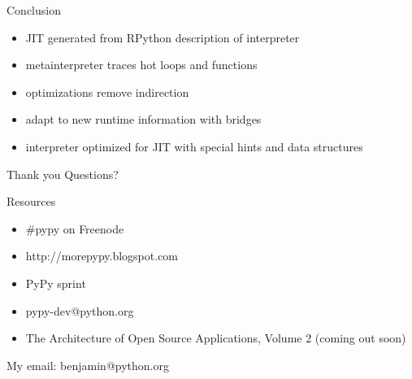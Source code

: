 \documentclass[14pt]{beamer}
\begin{document}
\begin{frame}{Conclusion}
\begin{itemize}
\item JIT generated from RPython description of interpreter
\item metainterpreter traces hot loops and functions
\item optimizations remove indirection
\item adapt to new runtime information with bridges
\item interpreter optimized for JIT with special hints and data structures
\end{itemize}
\end{frame}

\begin{frame}[fragile]{Thank you}
Questions?

Resources
\begin{itemize}
\item \#pypy on Freenode
\item http://morepypy.blogspot.com
\item PyPy sprint
\item pypy-dev@python.org
\item The Architecture of Open Source Applications, Volume 2 (coming out soon)
\end{itemize}


My email: benjamin@python.org
\end{frame}
\end{document}
